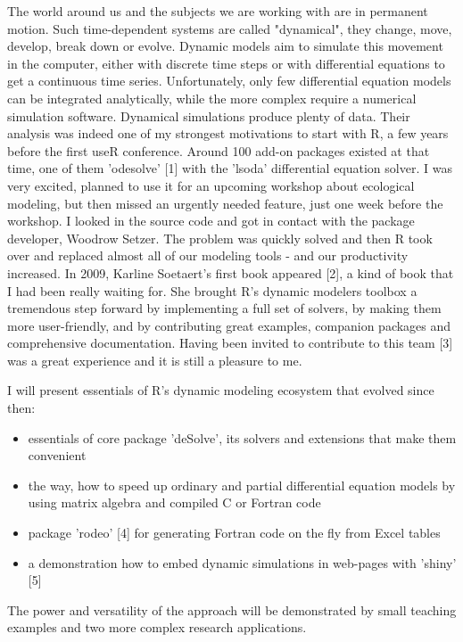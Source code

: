 \documentclass [12pt]{article}
\begin{document}
The world around us and the subjects we are working with are in permanent motion. Such time-dependent systems are called "dynamical", they change, move, develop, break down or evolve. Dynamic models aim to simulate this movement in the computer, either with discrete time steps or with differential equations to get a continuous time series. Unfortunately, only few differential equation models can be integrated analytically, while the more complex require a numerical simulation software. 
Dynamical simulations produce plenty of data. Their analysis was indeed one of my strongest motivations to start with R, a few years before the first useR conference. Around 100 add-on packages existed at that time, one of them 'odesolve' [1] with the 'lsoda' differential equation solver. I was very excited, planned to use it for an upcoming workshop about ecological modeling, but then missed an urgently needed feature, just one week before the workshop. I looked in the source code and got in contact with the package developer, Woodrow Setzer. The problem was quickly solved and then R took over and replaced almost all of our modeling tools - and our productivity increased. In 2009, Karline Soetaert's first book appeared [2], a kind of book that I had been really waiting for. She brought R's dynamic modelers toolbox a tremendous step forward by implementing a full set of solvers, by making them more user-friendly, and by contributing great examples, companion packages and comprehensive documentation. Having been invited to contribute to this team [3] was a great experience and it is still a pleasure to me.

I will present essentials of R's dynamic modeling ecosystem that evolved since then:
\begin{itemize}
\setlength\itemsep{.15em}
\item essentials of core package 'deSolve', its solvers and extensions that make them convenient
\item the way, how to speed up ordinary and partial differential equation models by using matrix algebra and compiled C or Fortran code
\item package 'rodeo' [4] for generating Fortran code on the fly from Excel tables
\item a demonstration how to embed dynamic simulations in web-pages with 'shiny' [5]
\end{itemize}
The power and versatility of the approach will be demonstrated by small teaching examples and two more complex research applications. 
\end{document}
